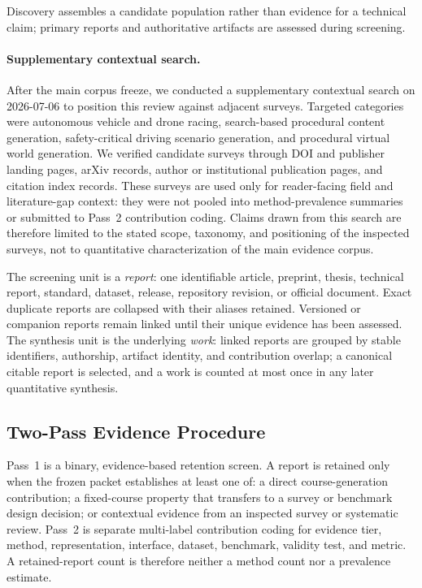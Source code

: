 Discovery assembles a candidate population rather than evidence for a technical
claim; primary reports and authoritative artifacts are assessed during screening.

\paragraph{Supplementary contextual search.}
After the main corpus freeze, we conducted a supplementary contextual search on
2026-07-06 to position this review against adjacent surveys. Targeted categories
were autonomous vehicle and drone racing, search-based procedural content
generation, safety-critical driving scenario generation, and procedural virtual
world generation. We verified candidate surveys through DOI and publisher landing
pages, arXiv records, author or institutional publication pages, and citation
index records. These surveys are used only for reader-facing field and
literature-gap context: they were not pooled into method-prevalence summaries or
submitted to Pass~2 contribution coding. Claims drawn from this search are
therefore limited to the stated scope, taxonomy, and positioning of the inspected
surveys, not to quantitative characterization of the main evidence corpus.

The screening unit is a \emph{report}: one identifiable article, preprint,
thesis, technical report, standard, dataset, release, repository revision, or
official document. Exact duplicate reports are collapsed with their aliases
retained. Versioned or companion reports remain linked until their unique
evidence has been assessed. The synthesis unit is the underlying \emph{work}:
linked reports are grouped by stable identifiers, authorship, artifact identity,
and contribution overlap; a canonical citable report is selected, and a work is
counted at most once in any later quantitative synthesis.

\subsection{Two-Pass Evidence Procedure}

Pass~1 is a binary, evidence-based retention screen. A report is retained only
when the frozen packet establishes at least one of: a direct course-generation
contribution; a fixed-course property that transfers to a survey or benchmark
design decision; or contextual evidence from an inspected survey or systematic
review. Pass~2 is separate multi-label contribution coding for evidence tier,
method, representation, interface, dataset, benchmark, validity test, and
metric. A retained-report count is therefore neither a method count nor a
prevalence estimate.

